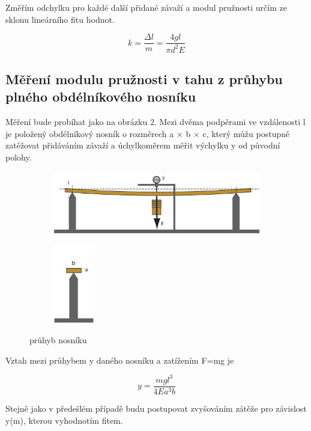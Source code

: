 \documentclass[a4paper,11pt]{article}
\begin{document}
Změřím odchylku pro každé další přidané závaží a modul pružnosti určím ze sklonu lineárního fitu hodnot.

\begin{equation}
  k = \frac{\Delta l}{m} = \frac{4 g l}{\pi d^2 E}
\end{equation}

\subsection{Měření modulu pružnosti v tahu z průhybu plného obdélníkového nosníku}

Měření bude probíhat jako na obrázku 2. Mezi dvěma podpěrami ve vzdálenosti l je položený obdélníkový nosník o rozměrech a $\times$ b $\times$ c, který můžu postupně zatěžovat přidáváním závaží a úchylkoměrem měřit výchylku y od původní polohy.

\begin{figure}[htpb]
  \centering
  \begin{subfigure}[b]{0.65\textwidth}
    \includegraphics[width=\textwidth]{nosnik_pred.jpg}
  \end{subfigure}
  \begin{subfigure}[b]{70pt}
    \includegraphics[width=51pt]{nosnik_bok.jpg}
  \end{subfigure}
  \caption{průhyb nosníku}
\end{figure}

Vztah mezi průhybem y daného nosníku a zatížením F=mg je

\begin{equation}
y = \frac{m g l^{3}}{4 E a^{3} b}
\end{equation}

Stejně jako v předešlém případě budu postupovat zvyšováním zátěže pro závislost y(m), kterou vyhodnotím fitem.
\end{document}
